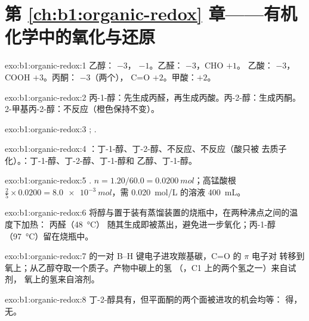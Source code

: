 \section*{第 \ref{ch:b1:organic-redox} 章——有机化学中的氧化与还原}

\begin{solution}{exo:b1:organic-redox:1}
乙醇： $-3$， $-1$。乙醛： $-3$，CHO $+1$。
乙酸： $-3$，COOH $+3$。丙酮： $-3$（两个），
C=O $+2$。甲酸：$+2$。
\end{solution}

\begin{solution}{exo:b1:organic-redox:2}
丙-1-醇：先生成丙醛，再生成丙酸。丙-2-醇：生成丙酮。
2-甲基丙-2-醇：不反应（橙色保持不变）。
\end{solution}

\begin{solution}{exo:b1:organic-redox:3}
;
.
\end{solution}

\begin{solution}{exo:b1:organic-redox:4}
：丁-1-醇、丁-2-醇、不反应、不反应（酸只被
去质子化）。：丁-1-醇、丁-2-醇、丁-1-醇和
乙醇、丁-1-醇。
\end{solution}

\begin{solution}{exo:b1:organic-redox:5}
.
$n = 1.20/60.0 = \qty{0.0200}{mol}$；高锰酸根 $\frac25 \times 0.0200 =
\qty{8.0e-3}{mol}$，需 \qty{0.020}{mol/L} 的溶液 \qty{400}{mL}。
\end{solution}

\begin{solution}{exo:b1:organic-redox:6}
将醇与置于装有蒸馏装置的烧瓶中，在两种沸点之间的温度下加热：
丙醛（\qty{48}{\celsius}）
随其生成即被蒸出，避免进一步氧化；丙-1-醇
（\qty{97}{\celsius}）留在烧瓶中。
\end{solution}

\begin{solution}{exo:b1:organic-redox:7}
 的一对 B--H 键电子进攻羰基碳，C=O 的 $\pi$ 电子对
转移到氧上；从乙醇夺取一个质子。产物中碳上的氢
（，C1 上的两个氢之一）来自试剂，
氧上的氢来自溶剂。
\end{solution}

\begin{solution}{exo:b1:organic-redox:8}
丁-2-醇具有，但平面酮的两个面被进攻的机会均等：
得，无。
\end{solution}

